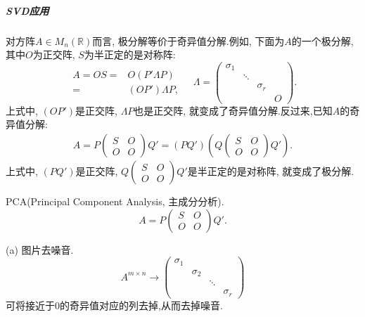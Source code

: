 \subparagraph{\color{ecolor}SVD应用}
\begin{asparaenum}[(1)]
  \item 对方阵$A\in M_n(\mathbb{R})$而言,
  极分解等价于奇异值分解.例如,
  下面为$A$的一个极分解,其中$O$为正交阵,
  $S$为半正定的是对称阵:
  \begin{equation*}
    \begin{aligned}
      A=OS = & O(P'\Lambda P)\\
      = & (OP')\Lambda P,
    \end{aligned}\quad 
    \Lambda=\begin{pmatrix}
      \sigma_1&&&\\
      &\ddots&&\\
      &&\sigma_r&\\
      &&&O
      \end{pmatrix}.
  \end{equation*}
上式中, $(OP')$是正交阵, $\Lambda P$也是正交阵,
就变成了奇异值分解.反过来,已知$A$的奇异值分解:
\begin{eqnarray*}
  A = P \begin{pmatrix}
    S&O\\
    O&O
    \end{pmatrix}Q' = (PQ')(Q\begin{pmatrix}
      S&O\\
      O&O
      \end{pmatrix}Q').
\end{eqnarray*}
上式中, $(PQ')$是正交阵, $Q\begin{pmatrix}
  S&O\\
  O&O
  \end{pmatrix}Q'$是半正定的是对称阵,
就变成了极分解.
\item PCA(Principal Component Analysis, 主成分分析).
\[
  A=P\begin{pmatrix}
    S&O\\
    O&O
  \end{pmatrix}Q'.
\]
  
(a) 图片去噪音.
  \[
    A^{m\times n} \longrightarrow \begin{pmatrix}
      \sigma_1&&&\\
      &\sigma_2&&\\
      &&\ddots&\\
      &&&\sigma_r
    \end{pmatrix}
  \]
  可将接近于0的奇异值对应的列去掉,从而去掉噪音.
  

\end{asparaenum}

